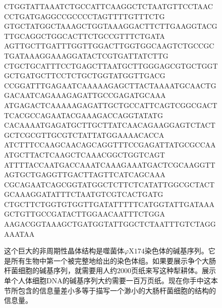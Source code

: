 \begin{figure}
\begin{dnaseq}
CTGGTATTAAATCTGCCATTCAAGGCTCTAATGTTCCTAACCCTGATGAGGCCGCCCCTAGTTTTGTTTCTG
GTGCTATGGCTAAAGCTGGTAAAGGACTTCTTGAAGGTACGTTGCAGGCTGGCACTTCTGCCGTTTCTGATA
AGTTGCTTGATTTGGTTGGACTTGGTGGCAAGTCTGCCGCTGATAAAGGAAAGGATACTCGTGATTATCTTG
CTGCTGCATTTCCTGAGCTTAATGCTTGGGAGCGTGCTGGTGCTGATGCTTCCTCTGCTGGTATGGTTGACG
CCGGATTTGAGAATCAAAAAGAGCTTACTAAAATGCAACTGGACAATCAGAAAGAGATTGCCGAGATGCAAA
ATGAGACTCAAAAAGAGATTGCTGCCATTCAGTCGGCGACTTCACGCCAGAATACGAAAGACCAGGTATATG
CACAAAATGAGATGCTTGCTTATCAACAGAAGGAGTCTACTGCTCGCGTTGCGTCTATTATGGAAAACACCA
ATCTTTCCAAGCAACAGCAGGTTTCCGAGATTATGCGCCAAATGCTTACTCAAGCTCAAACGGCTGGTCAGT
ATTTTACCAATGACCAAATCAAAGAAATGACTCGCAAGGTTAGTGCTGAGGTTGACTTAGTTCATCAGCAAA
CGCAGAATCAGCGGTATGGCTCTTCTCATATTGGCGCTACTGCAAAGGATATTTCTAATGTCGTCACTGATG
CTGCTTCTGGTGTGGTTGATATTTTTCATGGTATTGATAAAGCTGTTGCCGATACTTGGAACAATTTCTGGA
AAGACGGTAAAGCTGATGGTATTGGCTCTAATTTGTCTAGGAAATAA
\end{dnaseq}
\caption[噬菌体$\varphi\mathrm{X}174$染色体的碱基序列。]
  {这个巨大的非周期性晶体结构是噬菌体$\varphi\mathrm{X}174$染色体的碱基序列。它是所有生物中第一个被完整地给出的染色体组。如果要展示争个大肠杆菌细胞的碱基序列，就需要用人约$2000$页纸来写这种犁耕体。展示单个人体细胞DNA的碱基序列大约需要一百万页纸。现在你手中这本节所包含的信息量差小多等于描写一个渺小的大肠杆菌细胞的结构的信息量。}
\end{figure}


